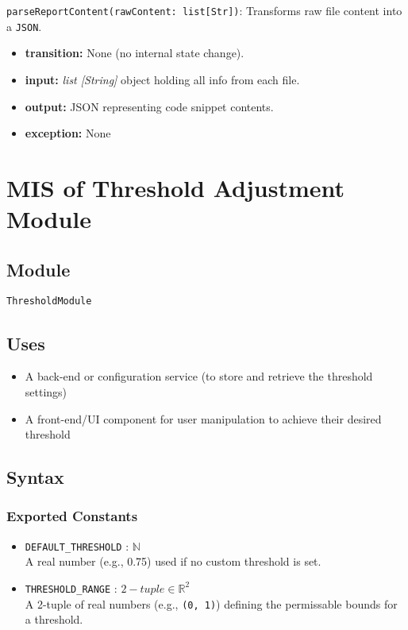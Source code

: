 \documentclass[12pt, titlepage]{article}
\begin{document}
\noindent \texttt{parseReportContent(rawContent: list[Str])}: Transforms raw file content into a \texttt{JSON}.
\begin{itemize}
        \item \textbf{transition:} None (no internal state change).
        \item \textbf{input:}  \textit{list [String]} object holding all info from each
        file.
        \item \textbf{output:} JSON representing code snippet contents.
        \item \textbf{exception:} None
\end{itemize}

\section{MIS of Threshold Adjustment Module} \label{mThreshold} %

\subsection{Module}

\texttt{ThresholdModule}

\subsection{Uses}

\begin{itemize}
    \item A back-end or configuration service (to store and retrieve the threshold settings)
    \item A front-end/UI component for user manipulation to achieve their desired threshold
\end{itemize}

\subsection{Syntax}

\subsubsection{Exported Constants}

\begin{itemize}
    \item \texttt{DEFAULT\_THRESHOLD} :  $\mathbb{N}$ \\
    A real number (e.g., 0.75) used if no custom threshold is set.
    \item \texttt{THRESHOLD\_RANGE} : $2-tuple \in \mathbb{R}^ 2 $ \\
    A 2-tuple of real numbers  (e.g., \texttt{(0, 1)}) defining the permissable bounds for a threshold.
\end{itemize}
\end{document}

